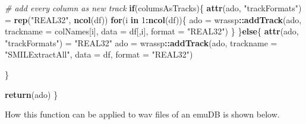 \documentclass[]{book}
\newenvironment{Shaded}{\begin{snugshade}}{\end{snugshade}}
\newcommand{\CommentTok}[1]{\textcolor[rgb]{0.56,0.35,0.01}{\textit{#1}}}
\newcommand{\ControlFlowTok}[1]{\textcolor[rgb]{0.13,0.29,0.53}{\textbf{#1}}}
\newcommand{\DataTypeTok}[1]{\textcolor[rgb]{0.13,0.29,0.53}{#1}}
\newcommand{\DecValTok}[1]{\textcolor[rgb]{0.00,0.00,0.81}{#1}}
\newcommand{\KeywordTok}[1]{\textcolor[rgb]{0.13,0.29,0.53}{\textbf{#1}}}
\newcommand{\NormalTok}[1]{#1}
\newcommand{\OperatorTok}[1]{\textcolor[rgb]{0.81,0.36,0.00}{\textbf{#1}}}
\newcommand{\StringTok}[1]{\textcolor[rgb]{0.31,0.60,0.02}{#1}}
\begin{document}
\begin{Shaded}
\begin{Highlighting}[]
  \CommentTok{# add every column as new track}
  \ControlFlowTok{if}\NormalTok{(columsAsTracks)\{}
    \KeywordTok{attr}\NormalTok{(ado, }\StringTok{"trackFormats"}\NormalTok{) =}\StringTok{ }\KeywordTok{rep}\NormalTok{(}\StringTok{"REAL32"}\NormalTok{, }\KeywordTok{ncol}\NormalTok{(df))}
    \ControlFlowTok{for}\NormalTok{(i }\ControlFlowTok{in} \DecValTok{1}\OperatorTok{:}\KeywordTok{ncol}\NormalTok{(df))\{}
\NormalTok{      ado =}\StringTok{ }\NormalTok{wrassp}\OperatorTok{::}\KeywordTok{addTrack}\NormalTok{(ado,}
                             \DataTypeTok{trackname =}\NormalTok{ colNames[i],}
                             \DataTypeTok{data =}\NormalTok{ df[,i],}
                             \DataTypeTok{format =} \StringTok{"REAL32"}\NormalTok{)}
\NormalTok{    \}}
\NormalTok{  \}}\ControlFlowTok{else}\NormalTok{\{}
    \KeywordTok{attr}\NormalTok{(ado, }\StringTok{"trackFormats"}\NormalTok{) =}\StringTok{ "REAL32"}
\NormalTok{    ado =}\StringTok{ }\NormalTok{wrassp}\OperatorTok{::}\KeywordTok{addTrack}\NormalTok{(ado,}
                           \DataTypeTok{trackname =} \StringTok{"SMILExtractAll"}\NormalTok{,}
                           \DataTypeTok{data =}\NormalTok{ df,}
                           \DataTypeTok{format =} \StringTok{"REAL32"}\NormalTok{)}

\NormalTok{  \}}

  \KeywordTok{return}\NormalTok{(ado)}
\NormalTok{\}}
\end{Highlighting}
\end{Shaded}

How this function can be applied to wav files of an emuDB is shown below.
\end{document}

